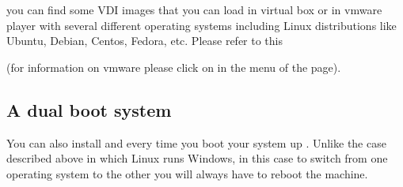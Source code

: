 \documentclass[letterpaper,10pt,english]{sphinxmanual}
\begin{document}
\sphinxAtStartPar
{}%
\begin{footnote}[18]\sphinxAtStartFootnote
{}
%
\end{footnote} you can find some VDI images that you can load in virtual box or in vmware player with several different operating systems including Linux distributions like Ubuntu, Debian, Centos, Fedora, etc. Please refer to this %
\begin{footnote}[19]\sphinxAtStartFootnote
{}
%
\end{footnote} (for information on vmware please click on  in the menu of the page).


\subsection{A dual boot system}
\label{\detokenize{M1_practical1:A-dual-boot-system}}
\sphinxAtStartPar
You can also install  and every time you boot your system up . Unlike the case described above in which Linux runs  Windows, in this case to switch from one operating system to the other you will always have to reboot the machine.
\end{document}
